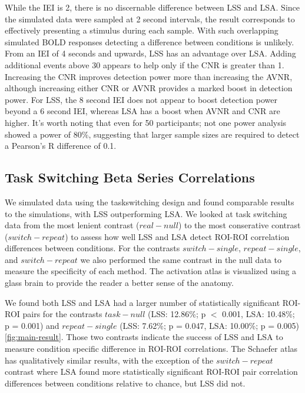 \documentclass[10pt,letterpaper]{article}
\begin{document}
While the IEI is 2, there is no discernable difference between LSS and LSA.
Since the simulated data were sampled at 2 second intervals, the result
corresponds to effectively presenting a stimulus during each sample.
With such overlapping simulated BOLD responses detecting a difference between conditions
is unlikely.
From an IEI of 4 seconds and upwards, LSS has an advantage over LSA.
Adding additional events above 30 appears to help only if the CNR is greater than 1.
Increasing the CNR improves detection power more than increasing the AVNR, although increasing either
CNR or AVNR provides a marked boost in detection power.
For LSS, the 8 second IEI does not appear to boost detection power beyond a 6 second IEI,
whereas LSA has a boost when AVNR and CNR are higher.
It's worth noting that even for 50 participants; not one power analysis showed
a power of 80\%, suggesting that larger sample sizes are required to detect a Pearson's R
difference of 0.1.


\subsection*{Task Switching Beta Series Correlations}
\label{results:bsc-taskswitch}

We simulated data using the taskswitching design and found comparable
results to the simulations, with LSS outperforming LSA.
We looked at task switching data from the most lenient
contrast ($real - null$) to the most conserative contrast ($switch - repeat$)
to assess how well LSS and LSA detect ROI-ROI correlation differences between conditions.
For the contrasts $switch - single$, $repeat - single$, and $switch - repeat$ we also
performed the same contrast in the null data to measure the specificity of each method.
The activation atlas is visualized using a glass brain to provide the reader a better sense
of the anatomy.

We found both LSS and LSA had a larger number of statistically significant ROI-ROI pairs
for the contrasts $task - null$ (LSS: 12.86\%; p $<$ 0.001, LSA: 10.48\%; p = 0.001)
and $repeat - single$ (LSS: 7.62\%; p = 0.047, LSA: 10.00\%; p = 0.005) \ref{fig:main-result}.
Those two contrasts indicate the success of LSS and LSA to measure
condition specific difference in ROI-ROI correlations.
The Schaefer atlas has qualitatively similar results, with the exception of
the $switch - repeat$ contrast where LSA found more statistically significant
ROI-ROI pair correlation differences between conditions relative to chance, but LSS did not.
\end{document}
